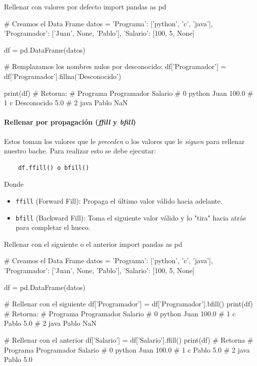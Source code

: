 \begin{pycode}{Rellenar con valores por defecto}
import pandas as pd

# Creamos el Data Frame
datos = {
    'Programa': ['python', 'c', 'java'],
    'Programador': ['Juan', None, 'Pablo'],
    'Salario': [100, 5, None]
}    

df = pd.DataFrame(datos)

# Remplazamos los nombres nulos por desconocido:
df['Programador'] = df['Programador'].fillna('Desconocido') 

print(df) # Retorna:
#   Programa  Programador  Salario
# 0   python         Juan    100.0
# 1        c  Desconocido      5.0
# 2     java        Pablo      NaN    
\end{pycode}

\paragraph{Rellenar por propagación (\textit{ffill} y \textit{bfill})}

Estos toman los valores que le \textit{preceden} o los valores que le \textit{siguen} para rellenar nuestro bache. Para realizar esto se debe ejecutar:
\begin{verbatim}
    df.ffill() o bfill()
\end{verbatim}
Donde \begin{itemize}
\item \texttt{ffill} (Forward Fill): Propaga el último valor válido hacia adelante. 
\item \texttt{bfill} (Backward Fill): Toma el siguiente valor válido y lo "tira" hacia atrás para completar el hueco.
\end{itemize}

\begin{pycode}{Rellenar con el siguiente o el anterior}
import pandas as pd

# Creamos el Data Frame
datos = {
    'Programa': ['python', 'c', 'java'],
    'Programador': ['Juan', None, 'Pablo'],
    'Salario': [100, 5, None]
}    

df = pd.DataFrame(datos)

# Rellenar con el siguiente
df['Programador'] = df['Programador'].bfill()
print(df) # Retorna:
#   Programa Programador  Salario
# 0   python        Juan    100.0
# 1        c       Pablo      5.0
# 2     java       Pablo      NaN

# Rellenar con el anterior
df['Salario'] = df['Salario'].ffill()
print(df) # Retorna
#   Programa Programador  Salario
# 0   python        Juan    100.0
# 1        c       Pablo      5.0
# 2     java       Pablo      5.0
\end{pycode}


